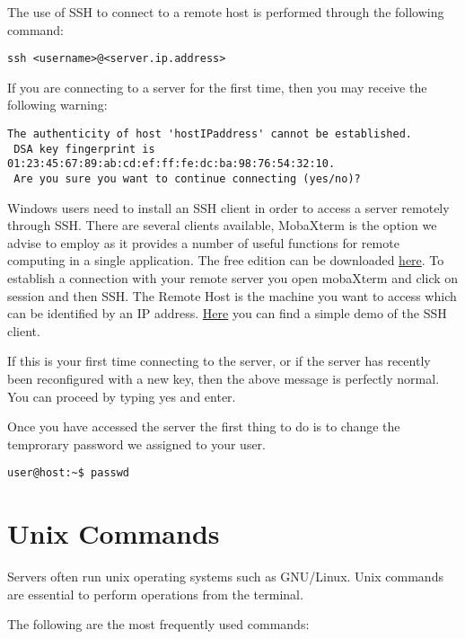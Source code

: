 \documentclass[
]{book}
\begin{document}
The use of SSH to connect to a remote host is performed through the following command:

\begin{verbatim}
ssh <username>@<server.ip.address>
\end{verbatim}

If you are connecting to a server for the first time, then you may receive the following warning:

\begin{verbatim}
The authenticity of host 'hostIPaddress' cannot be established.
 DSA key fingerprint is 01:23:45:67:89:ab:cd:ef:ff:fe:dc:ba:98:76:54:32:10.
 Are you sure you want to continue connecting (yes/no)?
\end{verbatim}

Windows users need to install an SSH client in order to access a server remotely through SSH. There are several clients available, MobaXterm is the option we advise to employ as it provides a number of useful functions for remote computing in a single application.
The free edition can be downloaded \href{https://mobaxterm.mobatek.net/download.html}{here}. To establish a connection with your remote server you open mobaXterm and click on session and then SSH. The Remote Host is the machine you want to access which can be identified by an IP address. \href{https://mobaxterm.mobatek.net/demo.html}{Here} you can find a simple demo of the SSH client.

If this is your first time connecting to the server, or if the server has recently been
reconfigured with a new key, then the above message is perfectly normal. You can proceed by typing yes and enter.

Once you have accessed the server the first thing to do is to change the temprorary password we assigned to your user.

\begin{verbatim}
user@host:~$ passwd
\end{verbatim}

\hypertarget{unix-commands}{%
\section{Unix Commands}\label{unix-commands}}

Servers often run unix operating systems such as GNU/Linux. Unix commands are essential to perform operations from the terminal.

The following are the most frequently used commands:
\end{document}
